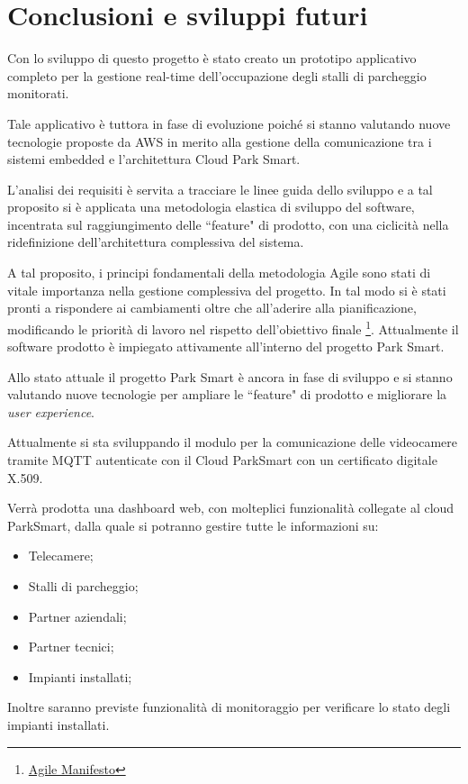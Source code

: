 \chapter{Conclusioni e sviluppi futuri}


Con lo sviluppo di questo progetto è stato creato un prototipo applicativo completo per la gestione real-time dell'occupazione degli stalli di parcheggio monitorati. 

Tale applicativo è tuttora in fase di evoluzione poiché si stanno valutando nuove tecnologie proposte da AWS in merito alla gestione della comunicazione tra i sistemi embedded e l'architettura Cloud Park Smart. 
\newline

L'analisi dei requisiti è servita a tracciare le linee guida dello sviluppo e a tal proposito si è applicata una metodologia elastica di sviluppo del software, incentrata sul raggiungimento delle ``feature" di prodotto, con una ciclicità nella ridefinizione dell'architettura complessiva del sistema.

A tal proposito, i principi fondamentali della metodologia Agile sono stati di vitale importanza nella gestione complessiva del progetto.
In tal modo si è stati pronti a rispondere ai cambiamenti oltre che all'aderire alla pianificazione, modificando le priorità di lavoro nel rispetto dell'obiettivo finale \footnote{\href{http://www.agilemanifesto.org}{Agile Manifesto}}.
Attualmente il software prodotto è impiegato attivamente all'interno del progetto Park Smart.	
\newline

Allo stato attuale il progetto Park Smart è ancora in fase di sviluppo e si stanno valutando nuove tecnologie per ampliare le ``feature" di prodotto e migliorare la \textit{user experience}. 

Attualmente si sta sviluppando il modulo per la comunicazione delle videocamere tramite MQTT autenticate con il Cloud ParkSmart con un certificato digitale X.509.
\newline

Verrà prodotta una dashboard web, con molteplici funzionalità collegate al cloud ParkSmart, dalla quale si potranno gestire tutte le informazioni su:
\begin{itemize}
	\item Telecamere;
	\item Stalli di parcheggio;
	\item Partner aziendali;
	\item Partner tecnici;
	\item Impianti installati;
\end{itemize}


Inoltre saranno previste funzionalità di monitoraggio per verificare lo stato degli impianti installati.

